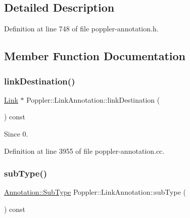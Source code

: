 \subsection{Detailed Description}


Definition at line 748 of file poppler-\/annotation.\+h.



\subsection{Member Function Documentation}
\mbox{\label{class_poppler_1_1_link_annotation_a747e4bd67e218223cd66b0128c494194}} 
\subsubsection{\texorpdfstring{link\+Destination()}{linkDestination()}}
{\footnotesize\ttfamily \hyperlink{class_poppler_1_1_link}{Link} $\ast$ Poppler\+::\+Link\+Annotation\+::link\+Destination (\begin{DoxyParamCaption}{ }\end{DoxyParamCaption}) const}

\begin{DoxySince}{Since}
0. 
\end{DoxySince}


Definition at line 3955 of file poppler-\/annotation.\+cc.

\mbox{\label{class_poppler_1_1_link_annotation_a05dbb8a3128989c44214ab9e3a1335dd}} 
\subsubsection{\texorpdfstring{sub\+Type()}{subType()}}
{\footnotesize\ttfamily \hyperlink{class_poppler_1_1_annotation_a2d592999c330949d64679cfa9e81113f}{Annotation\+::\+Sub\+Type} Poppler\+::\+Link\+Annotation\+::sub\+Type (\begin{DoxyParamCaption}{ }\end{DoxyParamCaption}) const\hspace{0.3cm}{\ttfamily [virtual]}}

